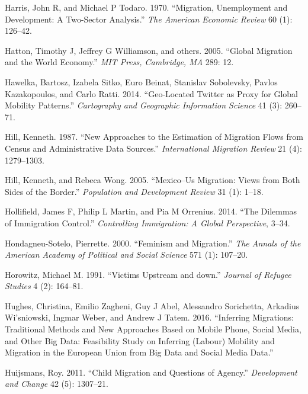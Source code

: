 \documentclass[
]{article}
\begin{document}
\leavevmode\hypertarget{ref-harris1970migration}{}%
Harris, John R, and Michael P Todaro. 1970. ``Migration, Unemployment
and Development: A Two-Sector Analysis.'' \emph{The American Economic
Review} 60 (1): 126--42.

\leavevmode\hypertarget{ref-hatton2005global}{}%
Hatton, Timothy J, Jeffrey G Williamson, and others. 2005. ``Global
Migration and the World Economy.'' \emph{MIT Press, Cambridge, MA} 289:
12.

\leavevmode\hypertarget{ref-hawelka2014geo}{}%
Hawelka, Bartosz, Izabela Sitko, Euro Beinat, Stanislav Sobolevsky,
Pavlos Kazakopoulos, and Carlo Ratti. 2014. ``Geo-Located Twitter as
Proxy for Global Mobility Patterns.'' \emph{Cartography and Geographic
Information Science} 41 (3): 260--71.

\leavevmode\hypertarget{ref-hill1987new}{}%
Hill, Kenneth. 1987. ``New Approaches to the Estimation of Migration
Flows from Census and Administrative Data Sources.'' \emph{International
Migration Review} 21 (4): 1279--1303.

\leavevmode\hypertarget{ref-hill2005mexico}{}%
Hill, Kenneth, and Rebeca Wong. 2005. ``Mexico--Us Migration: Views from
Both Sides of the Border.'' \emph{Population and Development Review} 31
(1): 1--18.

\leavevmode\hypertarget{ref-hollifield2014dilemmas}{}%
Hollifield, James F, Philip L Martin, and Pia M Orrenius. 2014. ``The
Dilemmas of Immigration Control.'' \emph{Controlling Immigration: A
Global Perspective}, 3--34.

\leavevmode\hypertarget{ref-hondagneu2000feminism}{}%
Hondagneu-Sotelo, Pierrette. 2000. ``Feminism and Migration.'' \emph{The
Annals of the American Academy of Political and Social Science} 571 (1):
107--20.

\leavevmode\hypertarget{ref-horowitz1991victims}{}%
Horowitz, Michael M. 1991. ``Victims Upstream and down.'' \emph{Journal
of Refugee Studies} 4 (2): 164--81.

\leavevmode\hypertarget{ref-hughes2016inferring}{}%
Hughes, Christina, Emilio Zagheni, Guy J Abel, Alessandro Sorichetta,
Arkadius Wi'sniowski, Ingmar Weber, and Andrew J Tatem. 2016.
``Inferring Migrations: Traditional Methods and New Approaches Based on
Mobile Phone, Social Media, and Other Big Data: Feasibility Study on
Inferring (Labour) Mobility and Migration in the European Union from Big
Data and Social Media Data.''

\leavevmode\hypertarget{ref-huijsmans2011child}{}%
Huijsmans, Roy. 2011. ``Child Migration and Questions of Agency.''
\emph{Development and Change} 42 (5): 1307--21.
\end{document}
